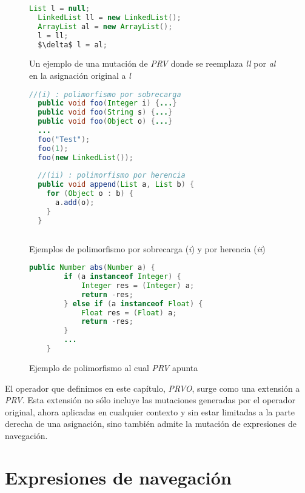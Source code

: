 \begin{figure}
	\begin{lstlisting}[mathescape=true, language=Java, extendedchars=true]
  List l = null;
  LinkedList ll = new LinkedList();
  ArrayList al = new ArrayList();
  l = ll;
  $\delta$ l = al;
	\end{lstlisting}
	\caption{Un ejemplo de una mutaci\'on de \emph{PRV} donde se reemplaza \emph{ll} por \emph{al} en la asignaci\'on original a \emph{l}}
	\label{figures.examples.PRV}
\end{figure}

\begin{figure}
	\begin{lstlisting}[mathescape=true, language=Java, extendedchars=true]
  //(i) : polimorfismo por sobrecarga
  public void foo(Integer i) {...}
  public void foo(String s) {...}
  public void foo(Object o) {...}
  ...
  foo("Test");
  foo(1);
  foo(new LinkedList());
  
  //(ii) : polimorfismo por herencia
  public void append(List a, List b) {
    for (Object o : b) {
      a.add(o);
    }
  }
  
	\end{lstlisting}
	\caption{Ejemplos de polimorfismo por sobrecarga (\emph{i}) y por herencia (\emph{ii})}
	\label{figures.examples.polimorfism}
\end{figure}

\begin{figure}
	\begin{lstlisting}[mathescape=true, language=Java, extendedchars=true,tabsize=3]
	public Number abs(Number a) {
		if (a instanceof Integer) {
			Integer res = (Integer) a;
			return -res;
		} else if (a instanceof Float) {
			Float res = (Float) a;
			return -res;
		}
		...
	}
	\end{lstlisting}
	\caption{Ejemplo de polimorfismo al cual \emph{PRV} apunta}
	\label{figures.examples.polimorfismPRV}
\end{figure}

El operador que definimos en este cap\'itulo, \emph{PRVO}, surge como una extensi\'on a \emph{PRV}. Esta extensi\'on no s\'olo incluye las mutaciones generadas por el operador original, ahora aplicadas en cualquier contexto y sin estar limitadas a la parte derecha de una asignaci\'on, sino tambi\'en admite la mutaci\'on de expresiones de navegaci\'on.


\section{Expresiones de navegaci\'on}
\label{sec:prvo.navigationalExpressions}

